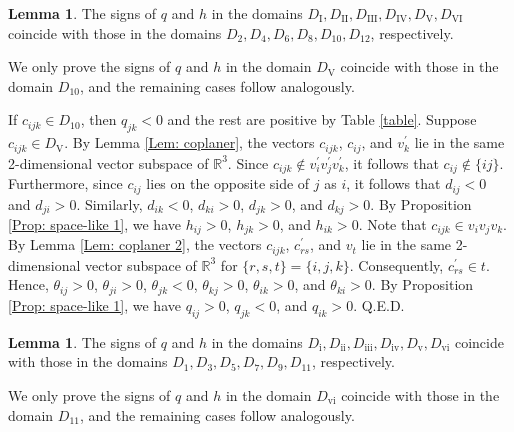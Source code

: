 \documentclass[12pt]{amsart}
\theoremstyle{definition}
\newtheorem{lemma}[theorem]{Lemma}
\def\qed{\hfill{Q.E.D.}\smallskip}
\begin{document}
\begin{lemma}\label{Lem: same signs 1}
The signs of $q$ and $h$ in the domains $D_\mathrm{I}, D_\mathrm{II}, D_\mathrm{III}, D_\mathrm{IV}, D_\mathrm{V}, D_\mathrm{VI}$ coincide with those in the domains $D_2,D_4,D_6,D_8,D_{10},D_{12}$, respectively.
\end{lemma}
\proof
We only prove the signs of $q$ and $h$ in the domain $D_{\mathrm{V}}$ coincide with those in the domain $D_{10}$, and the remaining cases follow analogously.

If $c_{ijk}\in D_{10}$, then $q_{jk}<0$ and the rest are positive by Table \ref{table}.
Suppose $c_{ijk}\in D_{\mathrm{V}}$.
By Lemma \ref{Lem: coplaner}, the vectors $c_{ijk}$, $c_{ij}$, and $v^\prime_k$ lie in the same 2-dimensional vector subspace of $\mathbb{R}^3$.
Since $c_{ijk}\notin v^\prime_iv^\prime_jv^\prime_k$,
it follows that $c_{ij}\notin \{ij\}$.
Furthermore, since $c_{ij}$ lies on the opposite side of $j$ as $i$, it follows that $d_{ij}<0$ and $d_{ji}>0$.
Similarly, $d_{ik}<0$, $d_{ki}>0$, $d_{jk}>0$, and $d_{kj}>0$.
By Proposition \ref{Prop: space-like 1},
we have $h_{ij}>0$, $h_{jk}>0$, and $h_{ik}>0$.
Note that $c_{ijk}\in v_iv_jv_k$.
By Lemma \ref{Lem: coplaner 2},
the vectors $c_{ijk}$, $c^\prime_{rs}$, and $v_t$ lie in the same 2-dimensional vector subspace of $\mathbb{R}^3$ for $\{r,s,t\}=\{i,j,k\}$.
Consequently, $c^\prime_{rs}\in t$.
Hence, $\theta_{ij}>0$, $\theta_{ji}>0$, $\theta_{jk}<0$, $\theta_{kj}>0$, $\theta_{ik}>0$, and $\theta_{ki}>0$.
By Proposition \ref{Prop: space-like 1},
we have $q_{ij}>0$, $q_{jk}<0$, and $q_{ik}>0$.
\qed

\begin{lemma}\label{Lem: same signs 2}
The signs of $q$ and $h$ in the domains $D_\mathrm{i}, D_\mathrm{ii}, D_\mathrm{iii}, D_\mathrm{iv}, D_\mathrm{v}, D_\mathrm{vi}$ coincide with those in the domains $D_1,D_3,D_5,D_7,D_{9},D_{11}$, respectively.
\end{lemma}
\proof
We only prove the signs of $q$ and $h$ in the domain $D_{\mathrm{vi}}$ coincide with those in the domain $D_{11}$, and the remaining cases follow analogously.
\end{document}
